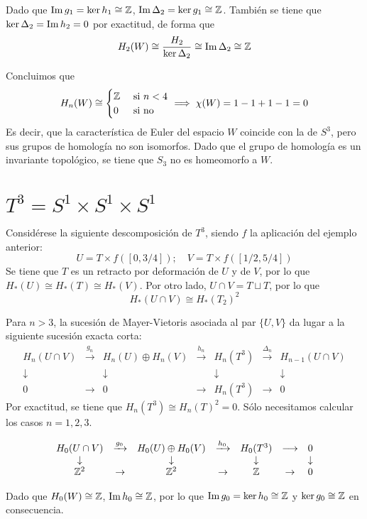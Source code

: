 Dado que $\operatorname{Im} g_1=\ker h_1\cong \mathbb{Z}$, $\operatorname{Im} \Delta_2=\ker g_1\cong \mathbb{Z}$. También se tiene que $\ker \Delta_2=\operatorname{Im} h_2=0$ por exactitud, de forma que $$H_2(W)\cong \frac{H_2}{\ker \Delta_2}\cong \operatorname{Im} \Delta_2\cong \mathbb{Z}$$

Concluimos que \[H_n(W)\cong\begin{cases}\mathbb{Z} & \mbox{ si }n < 4\\0 & \mbox{ si no}\end{cases} \implies\chi(W)=1-1+1-1=0\] Es decir, que la característica de Euler del espacio $W$ coincide con la de $S^3$, pero sus grupos de homología no son isomorfos. Dado que el grupo de homología es un invariante topológico, se tiene que $S_3$ no es homeomorfo a $W$.

\section{$T^3=S^1\times S^1 \times S^1$}
Considérese la siguiente descomposición de $T^3$, siendo $f$ la aplicación del ejemplo anterior: \[U=T\times f([0,3/4]); \quad V=T \times f([1/2,5/4])\] Se tiene que $T$ es un retracto por deformación de $U$ y de $V$, por lo que $H_*(U)\cong H_*(T) \cong H_*(V)$.
Por otro lado, $U\cap V=T\sqcup T$, por lo que \[H_*(U\cap V)\cong H_*(T_2)^2\]

Para $n > 3$, la sucesión de Mayer-Vietoris asociada al par $\{U,V\}$ da lugar a la siguiente sucesión exacta corta: \[\begin{array}{ccccccc}
H_n(U\cap V)&\xrightarrow{g_n}&H_n(U)\oplus H_n(V)	&\xrightarrow{h_n}	&H_n(T^3)		&\xrightarrow{\Delta_n}&H_{n-1}(U \cap V)\\
\downarrow&&\downarrow			&					&\downarrow	&					&\downarrow\\
0& \rightarrow&0			&\rightarrow			&H_n(T^3)		&\rightarrow			&0
\end{array}\] Por exactitud, se tiene que $H_n(T^3)\cong H_n(T)^2=0$. Sólo necesitamos calcular los casos $n=1,2,3$.

\[\begin{array}{ccccccc}
H_0(U\cap V)&\xrightarrow{g_0}&H_0(U)\oplus H_0(V)	&\xrightarrow{h_0}	&H_0(T^3)&\longrightarrow &0\\
\downarrow&					&\downarrow			&					&\downarrow & &\downarrow\\
\mathbb{Z}^2& \rightarrow&\mathbb{Z}^2			&\rightarrow			&\mathbb{Z} & \rightarrow & 0		
\end{array}\]

Dado que $H_0(W)\cong \mathbb{Z}$, $\operatorname{Im} h_0\cong \mathbb{Z}$, por lo que $\operatorname{Im} g_0=\ker h_0\cong \mathbb{Z}$ y $\ker g_0\cong \mathbb{Z}$ en consecuencia.

